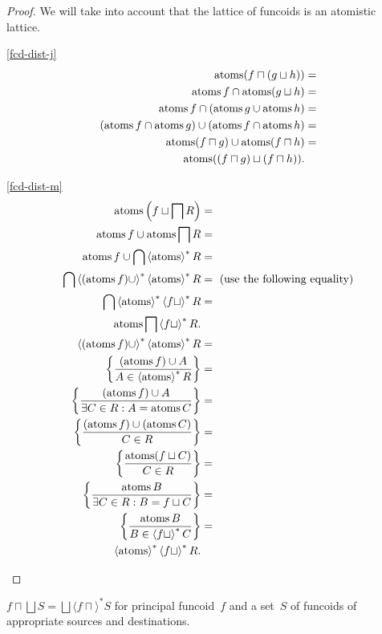 \begin{proof}
We will take into account that the lattice of funcoids is an atomistic
lattice.
\begin{widedisorder}
\item [{\ref{fcd-dist-j}}] ~
\begin{align*}
\atoms(f\sqcap(g\sqcup h)) & =\\
\atoms f\cap\atoms(g\sqcup h) & =\\
\atoms f\cap(\atoms g\cup\atoms h) & =\\
(\atoms f\cap\atoms g)\cup(\atoms f\cap\atoms h) & =\\
\atoms(f\sqcap g)\cup\atoms(f\sqcap h) & =\\
\atoms((f\sqcap g)\sqcup(f\sqcap h)).
\end{align*}

\item [{\ref{fcd-dist-m}}] ~
\begin{align*}
\atoms\left(f\sqcup\bigsqcap R\right) & =\\
\atoms f\cup\atoms\bigsqcap R & =\\
\atoms f\cup\bigcap\rsupfun{\atoms}R & =\\
\bigcap\rsupfun{(\atoms f)\cup}\rsupfun{\atoms}R & =\text{ (use the following
equality)}\\
\bigcap\rsupfun{\atoms}\rsupfun{f\sqcup}R & =\\
\atoms\bigsqcap\rsupfun{f\sqcup}R.\\
\rsupfun{(\atoms f)\cup}\rsupfun{\atoms}R & =\\
\setcond{(\atoms f)\cup A}{A\in\rsupfun{\atoms}R} & =\\
\setcond{(\atoms f)\cup A}{\exists C\in R:A=\atoms C} & =\\
\setcond{(\atoms f)\cup(\atoms C)}{C\in R} & =\\
\setcond{\atoms(f\sqcup C)}{C\in R} & =\\
\setcond{\atoms B}{\exists C\in R:B=f\sqcup C} & =\\
\setcond{\atoms B}{B\in\rsupfun{f\sqcup}C} & =\\
\rsupfun{\atoms}\rsupfun{f\sqcup}R.
\end{align*}

\end{widedisorder}
\end{proof}

\begin{conjecture}
$f \sqcap \bigsqcup S = \bigsqcup \langle f \sqcap \rangle^{\ast} S$ for principal funcoid~$f$ and a set~$S$ of
funcoids of appropriate sources and destinations.
\end{conjecture}

